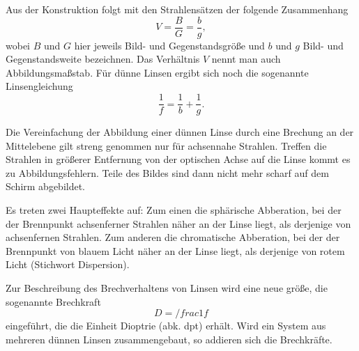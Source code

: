 Aus der Konstruktion folgt mit den Strahlensätzen der folgende
Zusammenhang
%
\begin{equation}
  \label{eq:abbildungsmassstab}
  V = \frac{B}{G} = \frac{b}{g},
\end{equation}
%
wobei $B$ und $G$ hier jeweils Bild- und Gegenstandsgröße und $b$ und
$g$ Bild- und Gegenstandsweite bezeichnen.  Das Verhältnis $V$ nennt man
auch Abbildungsmaßstab.  Für dünne Linsen ergibt sich noch die
sogenannte Linsengleichung
%
\begin{equation}
  \label{eq:linsengleichung}
  \frac{1}{f} = \frac{1}{b} + \frac{1}{g}.
\end{equation}

Die Vereinfachung der Abbildung einer dünnen Linse durch eine Brechung
an der Mittelebene gilt streng genommen nur für achsennahe Strahlen.
Treffen die Strahlen in größerer Entfernung von der optischen Achse auf
die Linse kommt es zu Abbildungsfehlern.  Teile des Bildes sind dann
nicht mehr scharf auf dem Schirm abgebildet.

Es treten zwei Haupteffekte auf: Zum einen die sphärische Abberation,
bei der der Brennpunkt achsenferner Strahlen näher an der Linse liegt,
als derjenige von achsenfernen Strahlen. Zum anderen die chromatische
Abberation, bei der der Brennpunkt von blauem Licht näher an der Linse
liegt, als derjenige von rotem Licht (Stichwort Dispersion).

Zur Beschreibung des Brechverhaltens von Linsen wird eine neue
größe, die sogenannte Brechkraft 
%
\begin{equation}
  \label{eq:brechkraft}
  D = /frac{1}{f}
\end{equation}
%
eingeführt, die die Einheit Dioptrie (abk. dpt) erhält. Wird ein System
aus mehreren dünnen Linsen zusammengebaut, so addieren sich die
Brechkräfte.
